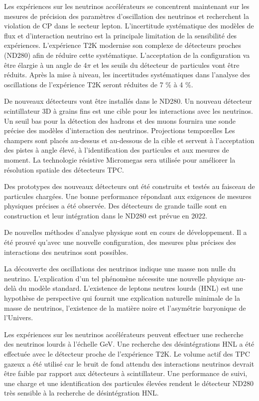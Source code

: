 \documentclass[./main.tex]{subfiles}
\begin{document}
Les expériences sur les neutrinos accélérateurs se concentrent maintenant sur les mesures de précision des paramètres d'oscillation des neutrinos et recherchent la violation de CP dans le secteur lepton. L'incertitude systématique des modèles de flux et d'interaction neutrino est la principale limitation de la sensibilité des expériences. L'expérience T2K modernise son complexe de détecteurs proches (ND280) afin de réduire cette systématique. L'acceptation de la configuration va être élargie à un angle de 4$\pi$ et les seuils du détecteur de particules vont être réduits. Après la mise à niveau, les incertitudes systématiques dans l'analyse des oscillations de l'expérience T2K seront réduites de 7 \% à 4 \%.

De nouveaux détecteurs vont être installés dans le ND280. Un nouveau détecteur scintillateur 3D à grains fins est une cible pour les interactions avec les neutrinos. Un seuil bas pour la détection des hadrons et des muons fournira une sonde précise des modèles d'interaction des neutrinos. Projections temporelles Les champers sont placés au-dessus et au-dessous de la cible et servent à l'acceptation des pistes à angle élevé, à l'identification des particules et aux mesures de moment. La technologie résistive Micromegas sera utilisée pour améliorer la résolution spatiale des détecteurs TPC.

Des prototypes des nouveaux détecteurs ont été construits et testés au faisceau de particules chargées. Une bonne performance répondant aux exigences de mesures physiques précises a été observée. Des détecteurs de grande taille sont en construction et leur intégration dans le ND280 est prévue en 2022.

De nouvelles méthodes d'analyse physique sont en cours de développement. Il a été prouvé qu'avec une nouvelle configuration, des mesures plus précises des interactions des neutrinos sont possibles.



La découverte des oscillations des neutrinos indique une masse non nulle du neutrino. L'explication d'un tel phénomène nécessite une nouvelle physique au-delà du modèle standard. L'existence de leptons neutres lourds (HNL) est une hypothèse de perspective qui fournit une explication naturelle minimale de la masse de neutrinos, l'existence de la matière noire et l'asymétrie baryonique de l'Univers.

Les expériences sur les neutrinos accélérateurs peuvent effectuer une recherche des neutrinos lourds à l'échelle GeV. Une recherche des désintégrations HNL a été effectuée avec le détecteur proche de l'expérience T2K. Le volume actif des TPC gazeux a été utilisé car le bruit de fond attendu des interactions neutrinos devrait être faible par rapport aux détecteurs à scintillateur. Une performance de suivi, une charge et une identification des particules élevées rendent le détecteur ND280 très sensible à la recherche de désintégration HNL.
\end{document}
